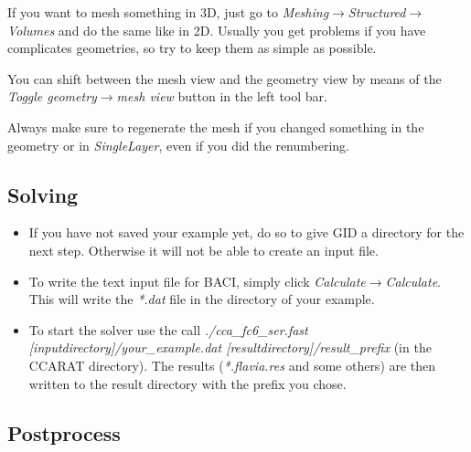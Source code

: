 If you want to mesh something in 3D, just go to \emph{Meshing$\to$Structured$\to$Volumes}
and do the same like in 2D. Usually you get problems if you have complicates
geometries, so try to keep them as simple as possible.

You can shift between the mesh view and the geometry view by means
of the \emph{Toggle geometry$\to$mesh view} button in the left tool
bar.

Always make sure to regenerate the mesh if you changed something in
the geometry or in \emph{SingleLayer}, even if you did the renumbering.


\subsection{Solving}

\begin{itemize}
\item If you have not saved your example yet, do so to give GID a directory
for the next step. Otherwise it will not be able to create an input file.
\item To write the text input file for BACI, simply click \emph{Calculate$\to$Calculate}.
This will write the \emph{{*}.dat} file in the directory of your example.
\item To start the solver use the call \emph{./cca\_fc6\_ser.fast [inputdirectory]/your\_example.dat
[resultdirectory]/result\_prefix} (in the CCARAT directory). The
results (\emph{{*}.flavia.res} and some others) are then written to
the result directory with the prefix you chose.
\end{itemize}

\subsection{Postprocess}


